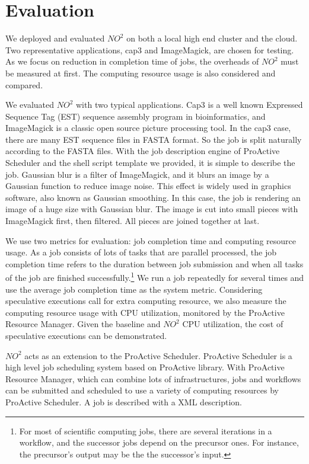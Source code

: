 \section{Evaluation}
We deployed and evaluated $NO^2$ on both a local high end cluster and the cloud. Two
representative applications, cap3 and ImageMagick, are chosen for testing. As we focus on
reduction in completion time of jobs, the overheads of $NO^2$ must be measured at first.
The computing resource usage is also considered and compared.

We evaluated $NO^2$ with two typical applications. Cap3 is a well known Expressed Sequence
Tag (EST) sequence assembly program in bioinformatics, and ImageMagick is a classic open
source picture processing tool. In the cap3 case, there are many EST sequence files in
FASTA format. So the job is split naturally according to the FASTA files. With the job
description engine of ProActive Scheduler and the shell script template we provided, it is
simple to describe the job. Gaussian blur is a filter of ImageMagick, and it blurs an
image by a Gaussian function to reduce image noise. This effect is widely used in graphics
software, also known as Gaussian smoothing. In this case, the job is rendering an image of
a huge size with Gaussian blur. The image is cut into small pieces with ImageMagick first,
then filtered. All pieces are joined together at last.

We use two metrics for evaluation: job completion time and computing resource usage. As a
job consists of lots of tasks that are parallel processed, the job completion time refers
to the duration between job submission and when all tasks of the job are finished
successfully.\footnote{For most of scientific computing jobs, there are several iterations
in a workflow, and the successor jobs depend on the precursor ones. For instance, the
precursor's output may be the the successor's input.} We run a job repeatedly for several
times and use the average job completion time as the system metric. Considering
speculative executions call for extra computing resource, we also measure the computing
resource usage with CPU utilization, monitored by the ProActive Resource Manager. Given
the baseline and $NO^2$ CPU utilization, the cost of speculative executions can be
demonstrated.

$NO^2$ acts as an extension to the ProActive Scheduler. ProActive Scheduler is a high
level job scheduling system based on ProActive library. With ProActive Resource Manager,
which can combine lots of infrastructures, jobs and workflows can be submitted and
scheduled to use a variety of computing resources by ProActive Scheduler. A job is
described with a XML description.


